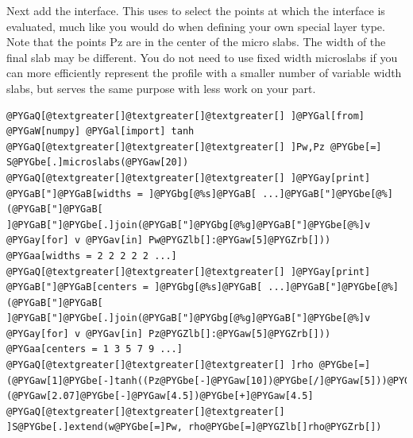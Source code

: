 \documentclass[letterpaper,10pt,english]{sphinxmanual}
\begin{document}
Next add the interface.  This uses  to select
the points at which the interface is evaluated, much like you
would do when defining your own special layer type.  Note that the
points Pz are in the center of the micro slabs.  The width of the
final slab may be different.  You do not need to use fixed width
microslabs if you can more efficiently represent the profile with
a smaller number of variable width slabs, but 
serves the same purpose with less work on your part.

\begin{Verbatim}[commandchars=@\[\]]
@PYGaQ[@textgreater[]@textgreater[]@textgreater[] ]@PYGal[from] @PYGaW[numpy] @PYGal[import] tanh
@PYGaQ[@textgreater[]@textgreater[]@textgreater[] ]Pw,Pz @PYGbe[=] S@PYGbe[.]microslabs(@PYGaw[20])
@PYGaQ[@textgreater[]@textgreater[]@textgreater[] ]@PYGay[print] @PYGaB["]@PYGaB[widths = ]@PYGbg[@%s]@PYGaB[ ...]@PYGaB["]@PYGbe[@%](@PYGaB["]@PYGaB[ ]@PYGaB["]@PYGbe[.]join(@PYGaB["]@PYGbg[@%g]@PYGaB["]@PYGbe[@%]v @PYGay[for] v @PYGav[in] Pw@PYGZlb[]:@PYGaw[5]@PYGZrb[]))
@PYGaa[widths = 2 2 2 2 2 ...]
@PYGaQ[@textgreater[]@textgreater[]@textgreater[] ]@PYGay[print] @PYGaB["]@PYGaB[centers = ]@PYGbg[@%s]@PYGaB[ ...]@PYGaB["]@PYGbe[@%](@PYGaB["]@PYGaB[ ]@PYGaB["]@PYGbe[.]join(@PYGaB["]@PYGbg[@%g]@PYGaB["]@PYGbe[@%]v @PYGay[for] v @PYGav[in] Pz@PYGZlb[]:@PYGaw[5]@PYGZrb[]))
@PYGaa[centers = 1 3 5 7 9 ...]
@PYGaQ[@textgreater[]@textgreater[]@textgreater[] ]rho @PYGbe[=] (@PYGaw[1]@PYGbe[-]tanh((Pz@PYGbe[-]@PYGaw[10])@PYGbe[/]@PYGaw[5]))@PYGbe[/]@PYGaw[2]@PYGbe[*](@PYGaw[2.07]@PYGbe[-]@PYGaw[4.5])@PYGbe[+]@PYGaw[4.5]
@PYGaQ[@textgreater[]@textgreater[]@textgreater[] ]S@PYGbe[.]extend(w@PYGbe[=]Pw, rho@PYGbe[=]@PYGZlb[]rho@PYGZrb[])
\end{Verbatim}
\end{document}
